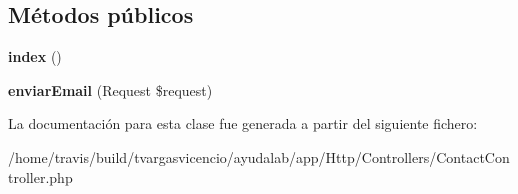 \subsection*{\-Métodos públicos}
\begin{DoxyCompactItemize}
\item 
\hypertarget{class_app_1_1_http_1_1_controllers_1_1_contact_controller_a149eb92716c1084a935e04a8d95f7347}{{\bfseries index} ()}\label{class_app_1_1_http_1_1_controllers_1_1_contact_controller_a149eb92716c1084a935e04a8d95f7347}

\item 
\hypertarget{class_app_1_1_http_1_1_controllers_1_1_contact_controller_afc7cc5ea133e1292053466675e234a49}{{\bfseries enviar\-Email} (\-Request \$request)}\label{class_app_1_1_http_1_1_controllers_1_1_contact_controller_afc7cc5ea133e1292053466675e234a49}

\end{DoxyCompactItemize}


\-La documentación para esta clase fue generada a partir del siguiente fichero\-:\begin{DoxyCompactItemize}
\item 
/home/travis/build/tvargasvicencio/ayudalab/app/\-Http/\-Controllers/\-Contact\-Controller.\-php\end{DoxyCompactItemize}
